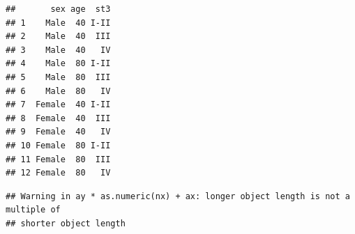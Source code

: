 \documentclass[
]{book}
\newenvironment{Shaded}{\begin{snugshade}}{\end{snugshade}}
\newcommand{\AttributeTok}[1]{\textcolor[rgb]{0.13,0.29,0.53}{#1}}
\newcommand{\CommentTok}[1]{\textcolor[rgb]{0.56,0.35,0.01}{\textit{#1}}}
\newcommand{\DecValTok}[1]{\textcolor[rgb]{0.00,0.00,0.81}{#1}}
\newcommand{\FunctionTok}[1]{\textcolor[rgb]{0.13,0.29,0.53}{\textbf{#1}}}
\newcommand{\NormalTok}[1]{#1}
\newcommand{\OtherTok}[1]{\textcolor[rgb]{0.56,0.35,0.01}{#1}}
\newcommand{\SpecialCharTok}[1]{\textcolor[rgb]{0.81,0.36,0.00}{\textbf{#1}}}
\newcommand{\StringTok}[1]{\textcolor[rgb]{0.31,0.60,0.02}{#1}}
\begin{document}
\begin{Shaded}
\end{Shaded}

\begin{verbatim}
##       sex age  st3
## 1    Male  40 I-II
## 2    Male  40  III
## 3    Male  40   IV
## 4    Male  80 I-II
## 5    Male  80  III
## 6    Male  80   IV
## 7  Female  40 I-II
## 8  Female  40  III
## 9  Female  40   IV
## 10 Female  80 I-II
## 11 Female  80  III
## 12 Female  80   IV
\end{verbatim}

\begin{Shaded}
\end{Shaded}

\begin{verbatim}
## Warning in ay * as.numeric(nx) + ax: longer object length is not a multiple of
## shorter object length
\end{verbatim}
\end{document}
